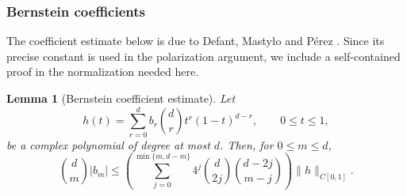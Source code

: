 \documentclass[11pt,a4paper]{article}
\numberwithin{equation}{section}
\theoremstyle{cleanplain}
\newtheorem{lemma}[lemma]{Lemma}
\theoremstyle{cleandefinition}
\theoremstyle{cleanremark}
\begin{document}
\subsubsection{Bernstein coefficients}

{\color{black}The coefficient estimate below is due to Defant, Masty\l o
and P\'erez \cite[Proposition~3.2]{DMP}.  Since its precise constant is used
in the polarization argument, we include a self-contained proof in the
normalization needed here.}

\begin{lemma}[Bernstein coefficient estimate]
\label{lem:Bernstein-coefficient-estimate}
Let
\begin{equation}\label{eq:Bernstein-expansion}
 h(t)=\sum_{r=0}^d b_r\binom dr t^r(1-t)^{d-r},
 \qquad 0\leq t\leq1,
\end{equation}
be a complex polynomial of degree at most $d$.  Then, for
$0\leq m\leq d$,
\begin{equation}\label{eq:Bernstein-coefficient-bound}
 \binom dm |b_m|
 \leq
 \left(
 \sum_{j=0}^{\min\{m,d-m\}}
 4^j\binom d{2j}\binom{d-2j}{m-j}
 \right)
 \|h\|_{C[0,1]}.
\end{equation}
\end{lemma}
\end{document}
